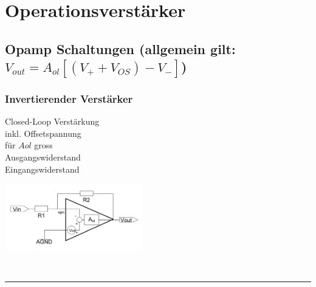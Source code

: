 \section{Operationsverstärker}
\subsection{Opamp Schaltungen (allgemein gilt: $V_{out} = A_{ol}[(V_+ + V_{OS})-V_-]$)}
	\subsubsection{Invertierender Verstärker}
    \begin{minipage}[T]{13cm}
      Closed-Loop Verst\"arkung
      \hspace{3mm}\\
		  inkl. Offsetspannung
		  \hspace{10.2mm}\\
      f\"ur $A{ol}$ gross
      \hspace{22mm}\\
      Ausgangswiderstand    \hspace{10.5mm}\\
      Eingangswiderstand    \hspace{11mm}
    \end{minipage}
		\begin{minipage}{6cm}
      \includegraphics[width=6cm]{./bilder/i-verstaerker.png}
    \end{minipage}\\
\hrule

